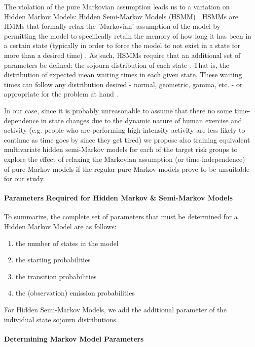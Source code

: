 \documentclass[]{article}
\begin{document}
The violation of the pure Markovian assumption leads us to a variation on Hidden Markov Models: Hidden Semi-Markov Models (HSMM) \cite{OConnell2011}. HSMMs are HMMs that formally relax the 'Markovian' assumption of the model by permitting the model to specifically retain the memory of how long it has been in a certain state (typically in order to force the model to not exist in a state for more than a desired time) \cite{OConnell2011}. As such, HSMMs require that an additional set of parameters be defined: the sojourn distribution of each state \cite{OConnell2011}. That is, the distribution of expected mean waiting times in each given state. These waiting times can follow any distribution desired - normal, geometric, gamma, etc. - or appropriate for the problem at hand \cite{OConnell2011}. 

In our case, since it is probably unreasonable to assume that there no some time-dependence in state changes due to the dynamic nature of human exercise and activity (e.g. people who are performing high-intensity activity are less likely to continue as time goes by since they get tired) we propose also training equivalent multivariate hidden semi-Markov models for each of the target risk groups to explore the effect of relaxing the Markovian assumption (or time-independence) of pure Markov models if the regular pure Markov models prove to be unsuitable for our study. 

\paragraph{Parameters Required for Hidden Markov \& Semi-Markov Models}

To summarize, the complete set of parameters that must be determined for a Hidden Markov Model are as follows:
\begin{enumerate}
	\item the number of states in the model
	\item the starting probabilities
	\item the transition probabilities
	\item the (observation) emission probabilities
\end{enumerate}
For Hidden Semi-Markov Models, we add the additional parameter of the individual state sojourn distributions.

\paragraph{Determining Markov Model Parameters}
\end{document}

